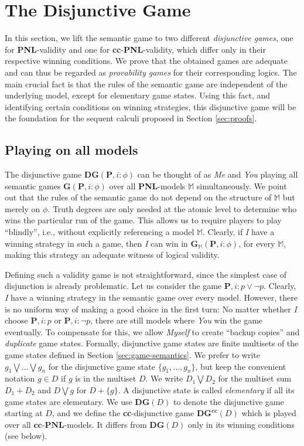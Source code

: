 \documentclass{easychair}
\newcommand{\I}{\emph{I}\xspace}
\newcommand{\You}{\emph{You}\xspace}
\newcommand{\Me}{\emph{Me}\xspace}
\newcommand{\M}{\mathbb{M}}
\newcommand{\PNL}{\textbf{PNL}}
\newcommand{\cc}{\textbf{cc}}
\begin{document}
 

\section{The Disjunctive Game}\label{sec:dis-game}

In this section, we lift the semantic game to two different \emph{disjunctive
games}, one for \PNL-validity and one for \cc-\PNL-validity, which differ only in
their respective winning conditions. We prove that the obtained games are
adequate and can thus be regarded as \emph{provability games} for their
corresponding logics. The main crucial fact is that the rules of the semantic
game are independent of the underlying model, except for elementary game
states. Using this fact, and
identifying certain conditions on winning strategies, this disjunctive game
will be the foundation for the sequent calculi proposed in Section \ref{sec:proofs}. 

\subsection{Playing on all models}\label{sec:dgame}
The disjunctive game
$\mathbf{DG}(\mathbf{P},i:\phi)$ can be thought of as \Me and \You playing all
semantic games $\mathbf{G}(\mathbf{P},i:\phi)$ over all \PNL-models $\M$
simultaneously. We point out that  the rules of the semantic game do not depend on the structure
of $\M$ but merely on $\phi$. Truth degrees are only needed at the atomic level
to determine who wins the particular run of the game. This allows us to require
players to play ``blindly'', i.e., without explicitly referencing  a model $\M$.
Clearly, if \I have a winning strategy in such a game, then \I can win in
$\mathbf{G}_\M(\mathbf{P},i:\phi)$, for every $\M$, making this strategy an
adequate witness of logical validity. 

Defining such a validity game is not straightforward, since the simplest case of disjunction
is already problematic.  Let us consider 
the game $\mathbf{P},i: p \vee \neg p$.
Clearly, \I have a winning strategy in the semantic game over every model.
However, there is no uniform way of making a good choice in the first turn: No
matter whether \I choose $\mathbf{P},i: p$ or $\mathbf{P},i: \neg p$, there are
still models where \You win the game eventually. To compensate for this, we
allow \emph{Myself} to create ``backup copies'' and \emph{duplicate} game
states. Formally, disjunctive game states are finite multisets of the game states
defined in Section \ref{sec:game-semantics}. We prefer to write $g_1 \bigvee ... \bigvee g_n$ for
the disjunctive game state $\{g_1,...,g_n\}$, but keep the convenient notation
$g\in D$ if $g$ is in the  multiset $D$. We write $D_1 \bigvee D_2$ for the
multiset sum $D_1+D_2$ and $D\bigvee g$ for $D+\{g\}$. A disjunctive state is
called \emph{elementary} if all its game states are elementary.
We use $\mathbf{DG}(D)$ to denote the disjunctive game starting at $D$,
and we define the \cc-disjunctive game $\mathbf{DG}^\cc(D)$ which is played
over all $\cc$-$\PNL$-models. It differs from $\mathbf{DG}(D)$ only in its
winning conditions (see below).
\end{document}
